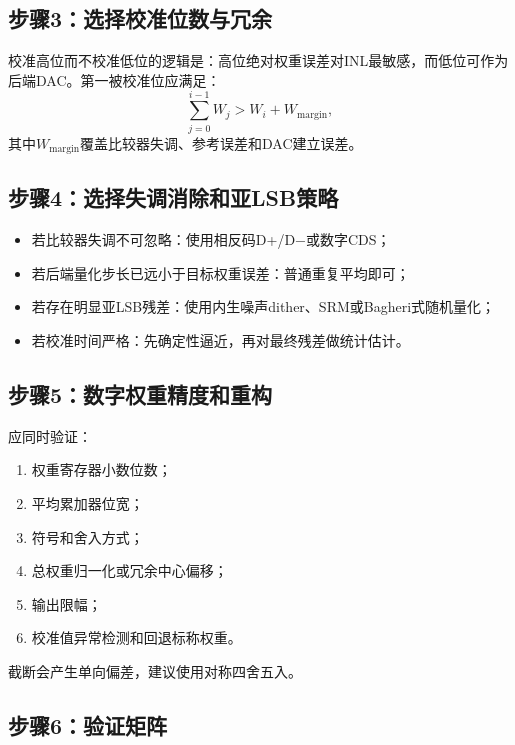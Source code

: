 \documentclass[UTF8,a4paper,11pt]{ctexart}
\begin{document}
\subsection{步骤3：选择校准位数与冗余}

校准高位而不校准低位的逻辑是：高位绝对权重误差对INL最敏感，而低位可作为后端DAC。第一被校准位应满足：
\begin{equation}
\sum_{j=0}^{i-1}W_j>W_i+W_{\mathrm{margin}},
\end{equation}
其中$W_{\mathrm{margin}}$覆盖比较器失调、参考误差和DAC建立误差。

\subsection{步骤4：选择失调消除和亚LSB策略}

\begin{itemize}
  \item 若比较器失调不可忽略：使用相反码D+/D$-$或数字CDS；
  \item 若后端量化步长已远小于目标权重误差：普通重复平均即可；
  \item 若存在明显亚LSB残差：使用内生噪声dither、SRM或Bagheri式随机量化；
  \item 若校准时间严格：先确定性逼近，再对最终残差做统计估计。
\end{itemize}

\subsection{步骤5：数字权重精度和重构}

应同时验证：
\begin{enumerate}
  \item 权重寄存器小数位数；
  \item 平均累加器位宽；
  \item 符号和舍入方式；
  \item 总权重归一化或冗余中心偏移；
  \item 输出限幅；
  \item 校准值异常检测和回退标称权重。
\end{enumerate}
截断会产生单向偏差，建议使用对称四舍五入。

\subsection{步骤6：验证矩阵}
\end{document}

